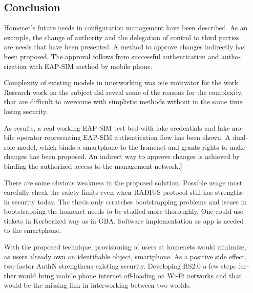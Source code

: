 \documentclass[12pt,a4paper,english]{tutthesis}
\begin{document}
\begin{otherlanguage}{english}
\chapter{Conclusion}
\label{sec-8}




Homenet's future needs in configuration management have been
described.
 As an example, the change of authority and the delegation of
control to third parties are needs that have been presented.  
A method to approve changes indirectly has been proposed. The approval
follows from successful authentication and authorization with EAP-SIM
method by mobile phone.


Complexity of existing models in interworking was one motivator for
the work. Research work on the subject did reveal some of the reasons 
for the complexity, that are difficult to overcome with simplistic 
methods without in the same time losing security.

As results, a real working EAP-SIM test bed with fake credentials and
fake mobile operator representing EAP-SIM authentication flow has been
shown.  A dual-role model, which binds a smartphone to the homenet and
grants rights to make changes has been proposed.  
An
indirect way to approve changes is achieved by binding the authorized
access to the management network.]

There are some obvious weakness in the proposed solution. Possible usage
must carefully check the safety limits even when RADIUS-protocol still
has strengths in security today. The thesis only scratches bootstrapping
problems and issues in bootstrapping the homenet needs to be studied
more thoroughly. One could use tickets in Kerberized way as in GBA.
Software implementation as app is needed to the smartphone.

With the proposed technique, provisioning of users at homenets would
minimize, as users already own an identifiable object, smartphone. As
a positive side effect, two-factor AuthN strengthens existing security.
Developing HS2.0 a few steps further would bring mobile phone internet
off-loading on Wi-Fi networks and that would be the missing link in
interworking between two worlds.

\newpage

\renewcommand{\bibname}{Bibliography}     %

\addcontentsline{toc}{chapter}{\bibname}  %


\end{otherlanguage}
\end{document}

